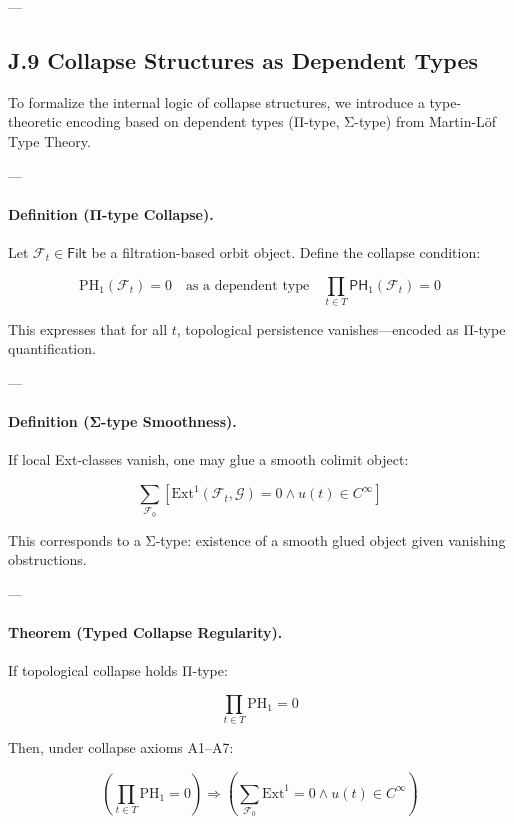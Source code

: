 \documentclass[11pt]{article}
\begin{document}
\begin{axiom}
\begin{axiom}
---

\subsection*{J.9 Collapse Structures as Dependent Types}

To formalize the internal logic of collapse structures, we introduce a type-theoretic encoding  
based on dependent types (Π-type, Σ-type) from Martin-Löf Type Theory.

---

\paragraph{Definition (Π-type Collapse).}
Let \( \mathcal{F}_t \in \mathsf{Filt} \) be a filtration-based orbit object.  
Define the collapse condition:

\[
\mathrm{PH}_1(\mathcal{F}_t) = 0
\quad \text{as a dependent type} \quad
\prod_{t \in T} \mathsf{PH}_1(\mathcal{F}_t) = 0
\]

This expresses that for all \( t \), topological persistence vanishes—encoded as Π-type quantification.

---

\paragraph{Definition (Σ-type Smoothness).}
If local Ext-classes vanish, one may glue a smooth colimit object:

\[
\sum_{\mathcal{F}_0} \left[ \mathrm{Ext}^1(\mathcal{F}_t, \mathcal{G}) = 0 \wedge u(t) \in C^\infty \right]
\]

This corresponds to a Σ-type: existence of a smooth glued object given vanishing obstructions.

---

\paragraph{Theorem (Typed Collapse Regularity).}
If topological collapse holds Π-type:

\[
\prod_{t \in T} \mathrm{PH}_1 = 0
\]

Then, under collapse axioms A1–A7:

\[
\boxed{
\left( \prod_{t \in T} \mathrm{PH}_1 = 0 \right)
\Rightarrow
\left( \sum_{\mathcal{F}_0} \mathrm{Ext}^1 = 0 \wedge u(t) \in C^\infty \right)
}
\]


\end{axiom}
\end{axiom}
\end{document}
